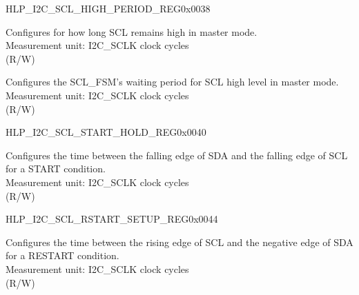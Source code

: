     \begin{register}{H}{LP\_I2C\_SCL\_HIGH\_PERIOD\_REG}{0x0038}\label{regdesc:LPI2CSCLHIGHPERIODREG}
    \regnewline%
    \begin{regdesc}\begin{reglist}
    \label{fielddesc:LPI2CSCLHIGHPERIOD}\item [LP\_I2C\_SCL\_HIGH\_PERIOD] Configures for how long SCL remains high in master mode.\\
    Measurement unit: I2C\_SCLK clock cycles \\ (R/W)
    \label{fielddesc:LPI2CSCLWAITHIGHPERIOD}\item [LP\_I2C\_SCL\_WAIT\_HIGH\_PERIOD] Configures the SCL\_FSM's waiting period for SCL high level in master mode.\\
    Measurement unit: I2C\_SCLK clock cycles \\ (R/W)
    \end{reglist}\end{regdesc}
    \end{register}


    \begin{register}{H}{LP\_I2C\_SCL\_START\_HOLD\_REG}{0x0040}\label{regdesc:LPI2CSCLSTARTHOLDREG}
    \regnewline%
    \begin{regdesc}\begin{reglist}
    \label{fielddesc:LPI2CSCLSTARTHOLDTIME}\item [LP\_I2C\_SCL\_START\_HOLD\_TIME] Configures the time between the falling edge of SDA and the falling edge of SCL for a START condition.\\
    Measurement unit: I2C\_SCLK clock cycles \\ (R/W)
    \end{reglist}\end{regdesc}
    \end{register}


    \begin{register}{H}{LP\_I2C\_SCL\_RSTART\_SETUP\_REG}{0x0044}\label{regdesc:LPI2CSCLRSTARTSETUPREG}
    \regnewline%
    \begin{regdesc}\begin{reglist}
    \label{fielddesc:LPI2CSCLRSTARTSETUPTIME}\item [LP\_I2C\_SCL\_RSTART\_SETUP\_TIME] Configures the time between the rising edge of SCL and the negative edge of SDA for a RESTART condition.\\
    Measurement unit: I2C\_SCLK clock cycles \\ (R/W)
    \end{reglist}\end{regdesc}
    \end{register}


